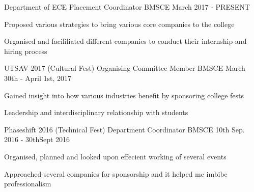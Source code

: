 \begin{cventries}
  \cventry
    {Department of ECE}
    {Placement Coordinator}
    {BMSCE}
    {March 2017 - PRESENT}
    {
      \begin{cvitems}
        \item {Proposed various strategies to bring various core companies to the college}
        \item {Organised and facililiated different companies to conduct their internship and hiring process}
      \end{cvitems}
    }
    \cventry
    {UTSAV 2017 (Cultural Fest)}
    {Organising Committee Member}
    {BMSCE}
    {March 30th - April 1st, 2017}
    {
      \begin{cvitems}
        \item {Gained insight into how various industries benefit by sponsoring college fests}
         \item {Leadership and interdisciplinary relationship with students}
      \end{cvitems}
    }
  \cventry
    {Phaseshift 2016 (Technical Fest)}
    {Department Coordinator}
    {BMSCE}
    {10th Sep. 2016 - 30thSept 2016}
    {
      \begin{cvitems}
        \item {Organised, planned and looked upon effecient working of several events}
        \item {Approached several companies for sponsorship and it helped me imbibe professionalism}
      \end{cvitems}
    }
  
\end{cventries}

